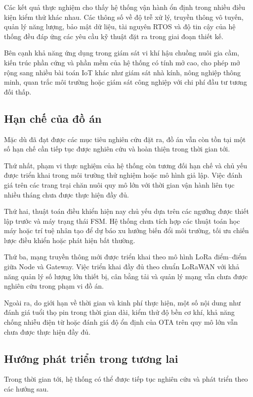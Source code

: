 Các kết quả thực nghiệm cho thấy hệ thống vận hành ổn định trong nhiều điều kiện kiểm thử khác nhau. Các thông số về độ trễ xử lý, truyền thông vô tuyến, quản lý năng lượng, bảo mật dữ liệu, tài nguyên RTOS và độ tin cậy của hệ thống đều đáp ứng các yêu cầu kỹ thuật đặt ra trong giai đoạn thiết kế.

Bên cạnh khả năng ứng dụng trong giám sát vi khí hậu chuồng nuôi gia cầm, kiến trúc phần cứng và phần mềm của hệ thống có tính mở cao, cho phép mở rộng sang nhiều bài toán IoT khác như giám sát nhà kính, nông nghiệp thông minh, quan trắc môi trường hoặc giám sát công nghiệp với chi phí đầu tư tương đối thấp.

\subsection{Hạn chế của đồ án}

Mặc dù đã đạt được các mục tiêu nghiên cứu đặt ra, đồ án vẫn còn tồn tại một số hạn chế cần tiếp tục được nghiên cứu và hoàn thiện trong thời gian tới.

Thứ nhất, phạm vi thực nghiệm của hệ thống còn tương đối hạn chế và chủ yếu được triển khai trong môi trường thử nghiệm hoặc mô hình giả lập. Việc đánh giá trên các trang trại chăn nuôi quy mô lớn với thời gian vận hành liên tục nhiều tháng chưa được thực hiện đầy đủ.

Thứ hai, thuật toán điều khiển hiện nay chủ yếu dựa trên các ngưỡng được thiết lập trước và máy trạng thái FSM. Hệ thống chưa tích hợp các thuật toán học máy hoặc trí tuệ nhân tạo để dự báo xu hướng biến đổi môi trường, tối ưu chiến lược điều khiển hoặc phát hiện bất thường.

Thứ ba, mạng truyền thông mới được triển khai theo mô hình LoRa điểm--điểm giữa Node và Gateway. Việc triển khai đầy đủ theo chuẩn LoRaWAN với khả năng quản lý số lượng lớn thiết bị, cân bằng tải và quản lý mạng vẫn chưa được nghiên cứu trong phạm vi đồ án.

Ngoài ra, do giới hạn về thời gian và kinh phí thực hiện, một số nội dung như đánh giá tuổi thọ pin trong thời gian dài, kiểm thử độ bền cơ khí, khả năng chống nhiễu điện từ hoặc đánh giá độ ổn định của OTA trên quy mô lớn vẫn chưa được thực hiện đầy đủ.

\subsection{Hướng phát triển trong tương lai}

Trong thời gian tới, hệ thống có thể được tiếp tục nghiên cứu và phát triển theo các hướng sau.

